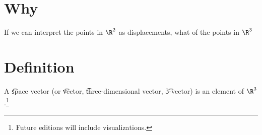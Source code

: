 
\section*{Why}

If we can interpret the points in $\R ^2$ as displacements, what of the points in $\R ^3$

\section*{Definition}

A \t{space vector} (or \t{vector}, \t{three-dimensional vector}, \t{3-vector}) is an element of $\R ^3$.\footnote{Future editions will include visualizations.}

\blankpage